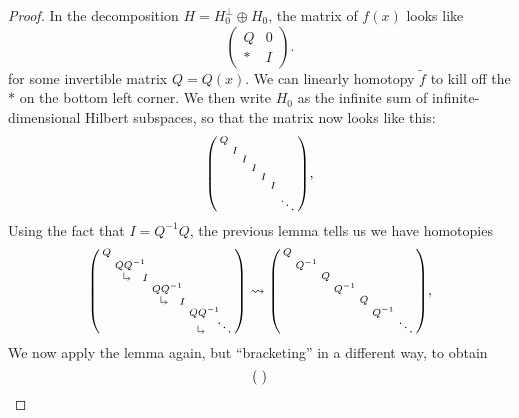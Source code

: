 \documentclass{shortart}
\theoremstyle{definition}
\newcommand\rotarrow{\begin{tikzpicture}\draw (0.15, 0) -- (0, 0) -- (0, 0.15); \draw (0.1, 0.05) -- (0.15, 0) -- (0.1, -0.05);\end{tikzpicture}}
\newcommand\id{I}
\newenvironment{psmallmatrix}
  {\left(\begin{smallmatrix}}
  {\end{smallmatrix}\right)}
\begin{document}
\begin{proof}
  In the decomposition $H = H_0^\perp \oplus H_0$, the matrix of $f(x)$ looks like
  \[
    \begin{pmatrix}
      Q & 0\\
      * & \id
    \end{pmatrix}.
  \]
  for some invertible matrix $Q = Q(x)$. We can linearly homotopy $\tilde{f}$ to kill off the $*$ on the bottom left corner. We then write $H_0$ as the infinite sum of infinite-dimensional Hilbert subspaces, so that the matrix now looks like this:
  \[
    \begin{psmallmatrix}
      Q \\
      & \id\\
      & & \id\\
      & & & \id\\
      & & & & \id\\
      & & & & & \id\\
      & & & & & & \ddots
    \end{psmallmatrix},
  \]
  Using the fact that $\id =Q^{-1}Q$, the previous lemma tells us we have homotopies
  \[
    \begin{psmallmatrix}
      Q \\
      & QQ^{-1}\hspace{-5pt}\\
      & \rotarrow & \id\\
      & & & QQ^{-1}\hspace{-5pt}\\
      & & & \rotarrow & \id\\
      & & & & & QQ^{-1}\hspace{-5pt}\vspace{-5pt}\\
      & & & & & \rotarrow & \ddots
    \end{psmallmatrix}
    \rightsquigarrow
    \begin{psmallmatrix}
      Q \\
      & Q^{-1}\\
      & & Q\\
      & & & Q^{-1}\\
      & & & & Q\\
      & & & & & Q^{-1}\vspace{-5pt}\\
      & & & & & & \ddots
    \end{psmallmatrix},
  \]
  We now apply the lemma again, but ``bracketing'' in a different way, to obtain
  \[
    \begin{psmallmatrix}

\end{psmallmatrix}\]
\end{proof}
\end{document}
